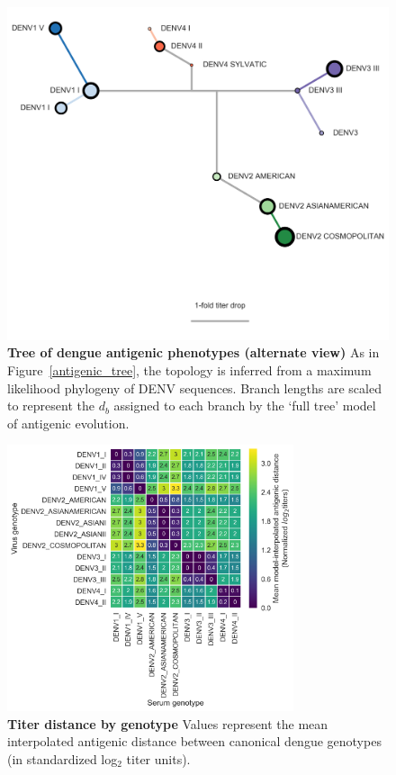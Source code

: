 \begin{figure}[ht!]
  \centering
  \includegraphics[width=\textwidth]{./png/antigenic_tree_supplement.png}
  \caption[Tree of dengue antigenic phenotypes (alternate view)]{\textbf{Tree of dengue antigenic phenotypes (alternate view) }
As in Figure~\ref{antigenic_tree}, the topology is inferred from a maximum likelihood phylogeny of DENV sequences.
Branch lengths are scaled to represent the $d_b$ assigned to each branch by the `full tree' model of antigenic evolution.
  }
\label{antigenic_tree_supplement}
\end{figure}

\begin{figure}[ht!]
\centering
	\includegraphics[width=0.75\textwidth]{./png/genotype_dTiter_heatmap.png}
	\caption[Titer distance by genotype]{\textbf{Titer distance by genotype }
  Values represent the mean interpolated antigenic distance between canonical dengue genotypes (in standardized log$_2$ titer units).
  }
	\label{genotype_dTiter_heatmap}
\end{figure}





